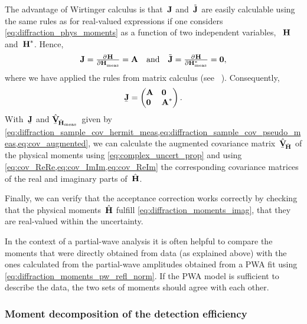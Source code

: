 The advantage of Wirtinger calculus is that~$\bm{\mathrm{J}}$
and~$\tilde{\bm{\mathrm{J}}}$ are easily calculable using the same rules as
for real-valued expressions if one considers
\cref{eq:diffraction_phys_moments} as a function of two independent
variables, ~$\bm{\mathrm{H}}$ and~$\bm{\mathrm{H}}^*$.  Hence,
\begin{equation}
  \mat{J}
  = \pd{\vect{H}}{\vect{H}_\text{meas}}
  = \mat{A}
  \quad\text{and}\quad
  \tilde{\mat{J}}
  = \pd{\vect{H}}{{\vect{H}_\text{meas}^*}}
  = \mat{0},
\end{equation}
where we have applied the rules from matrix calculus (see \eg\
).  Consequently,
\begin{equation}
  \underaccent{\bar}{\mat{J}}
  = \begin{pmatrix*}[l]
    \mat{A} & \mat{0} \\
    \mat{0} & \mat{A}^*
  \end{pmatrix*}.
\end{equation}
With~$\underaccent{\bar}{\mat{J}}$ and
$\hat{\underaccent{\bar}{\covMatSym}}_{\!\hat{\vect{H}}_\text{meas}}$~given
by
\cref{eq:diffraction_sample_cov_hermit_meas,eq:diffraction_sample_cov_pseudo_meas,eq:cov_augmented},
we can calculate the augmented covariance
matrix~$\hat{\underaccent{\bar}{\covMatSym}}_{\!\hat{\vect{H}}}$ of
the physical moments using \cref{eq:complex_uncert_prop} and using
\cref{eq:cov_ReRe,eq:cov_ImIm,eq:cov_ReIm} the corresponding
covariance matrices of the real and imaginary parts
of~$\hat{\bm{\mathrm{H}}}$.

Finally, we can verify that the acceptance correction works correctly
by checking that the physical moments~$\hat{\bm{\mathrm{H}}}$ fulfill
\cref{eq:diffraction_moments_imag}, \ie that they are real-valued
within the uncertainty.

In the context of a partial-wave analysis it is often helpful to
compare the moments that were directly obtained from data (as
explained above) with the ones calculated from the partial-wave
amplitudes obtained from a PWA fit using
\cref{eq:diffraction_moments_pw_refl_norm}.  If the PWA model is sufficient
to describe the data, the two sets of moments should agree with each
other.


\subsubsection{Moment decomposition of the detection efficiency}%
\label{sec:diffraction:acceptance_moment_decomp}

